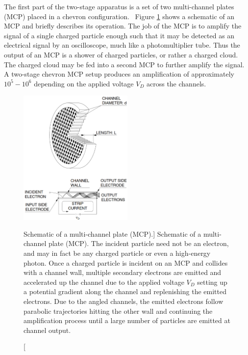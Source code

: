 The first part of the two-stage apparatus is a set of two multi-channel plates (MCP) placed in a chevron configuration.\footnotemark~ Figure \ref{fig:MCP} shows a schematic of an MCP and briefly describes its operation. The job of the MCP is to amplify the signal of a single charged particle enough such that it may be detected as an electrical signal by an oscilloscope, much like a photomultiplier tube. Thus the output of an MCP is a shower of charged particles, or rather a charged cloud. The charged cloud may be fed into a second MCP to further amplify the signal. A two-stage chevron MCP setup produces an amplification of approximately $10^5-10^6$ depending on the applied voltage $V_D$ across the channels.


\begin{figure}
  \centering
  \includegraphics[width=0.50\textwidth]{gfx/MCP}
  \caption
  [Schematic of a multi-channel plate (MCP).]
  {Schematic of a multi-channel plate (MCP). The incident particle need not be an electron, and may in fact be any charged particle or even a high-energy photon. Once a charged particle is incident on an MCP and collides with a channel wall, multiple secondary electrons are emitted and accelerated up the channel due to the applied voltage $V_D$ setting up a potential gradient along the channel and replenishing the emitted electrons. Due to the angled channels, the emitted electrons follow parabolic trajectories hitting the other wall and continuing the amplification process until a large number of particles are emitted at channel output.}
  \label{fig:MCP}
\end{figure}

